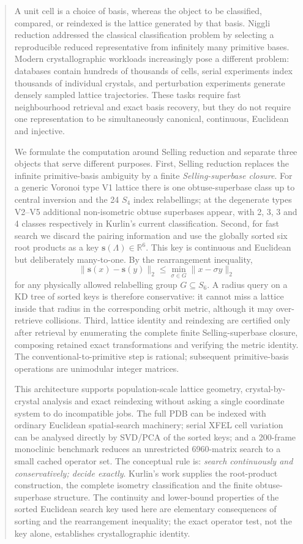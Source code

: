 \documentclass[11pt]{article}
\newcommand{\sortkey}{\mathbf{s}}
\begin{document}
\begin{abstract}
A unit cell is a choice of basis, whereas the object to be classified, compared, or reindexed is the lattice generated by that basis. Niggli reduction addressed the classical classification problem by selecting a reproducible reduced representative from infinitely many primitive bases. Modern crystallographic workloads increasingly pose a different problem: databases contain hundreds of thousands of cells, serial experiments index thousands of individual crystals, and perturbation experiments generate densely sampled lattice trajectories. These tasks require fast neighbourhood retrieval and exact basis recovery, but they do not require one representation to be simultaneously canonical, continuous, Euclidean and injective.

We formulate the computation around Selling reduction and separate three objects that serve different purposes. First, Selling reduction replaces the infinite primitive-basis ambiguity by a finite \emph{Selling-superbase closure}. For a generic Voronoi type V1 lattice there is one obtuse-superbase class up to central inversion and the 24 $S_4$ index relabellings; at the degenerate types V2--V5 additional non-isometric obtuse superbases appear, with 2, 3, 3 and 4 classes respectively in Kurlin's current classification. Second, for fast search we discard the pairing information and use the globally sorted six root products as a key $\sortkey(\Lambda)\in\mathbb R^6$. This key is continuous and Euclidean but deliberately many-to-one. By the rearrangement inequality,
\[
\|\sortkey(x)-\sortkey(y)\|_2 \leq \min_{\sigma\in G}\|x-\sigma y\|_2
\]
for any physically allowed relabelling group $G\subseteq S_6$. A radius query on a KD tree of sorted keys is therefore conservative: it cannot miss a lattice inside that radius in the corresponding orbit metric, although it may over-retrieve collisions. Third, lattice identity and reindexing are certified only after retrieval by enumerating the complete finite Selling-superbase closure, composing retained exact transformations and verifying the metric identity. The conventional-to-primitive step is rational; subsequent primitive-basis operations are unimodular integer matrices.

This architecture supports population-scale lattice geometry, crystal-by-crystal analysis and exact reindexing without asking a single coordinate system to do incompatible jobs. The full PDB can be indexed with ordinary Euclidean spatial-search machinery; serial XFEL cell variation can be analysed directly by SVD/PCA of the sorted keys; and a 200-frame monoclinic benchmark reduces an unrestricted 6960-matrix search to a small cached operator set. The conceptual rule is: \emph{search continuously and conservatively; decide exactly}. Kurlin's work supplies the root-product construction, the complete isometry classification and the finite obtuse-superbase structure. The continuity and lower-bound properties of the sorted Euclidean search key used here are elementary consequences of sorting and the rearrangement inequality; the exact operator test, not the key alone, establishes crystallographic identity.
\end{abstract}
\end{document}
